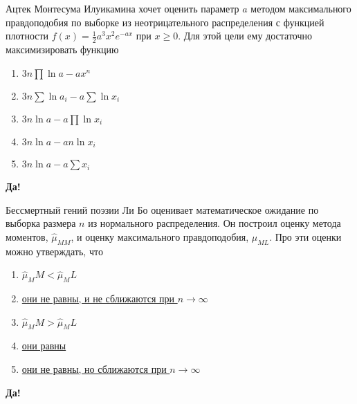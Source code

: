 \documentclass[t]{beamer}
\begin{document}
 \begin{frame} \label{21-Yes} 
\begin{block}{21} 

Ацтек Монтесума Илуикамина хочет оценить параметр $a$ методом максимального правдоподобия по выборке из неотрицательного распределения с функцией плотности $f(x)=\frac{1}{2}a^3x^2e^{-ax}$ при $x\geq 0$. Для этой цели ему достаточно максимизировать функцию
 


 \end{block} 
\begin{enumerate} 
\item[] \hyperlink{21-No}{\beamergotobutton{} $3n\prod \ln a - a x^n$}
\item[] \hyperlink{21-No}{\beamergotobutton{} $3n \sum \ln a_i - a \sum \ln x_i$}
\item[] \hyperlink{21-No}{\beamergotobutton{} $3n\ln a - a \prod \ln x_i$}
\item[] \hyperlink{21-No}{\beamergotobutton{} $3n \ln a - an \ln x_i$}
\item[] \hyperlink{21-Yes}{\beamergotobutton{} $3n \ln a - a \sum x_i$}
\end{enumerate} 

 \textbf{Да!} 
 \hyperlink{22}{}\end{frame} 


 \begin{frame} \label{22-Yes} 
\begin{block}{22} 

Бессмертный гений поэзии Ли Бо оценивает математическое ожидание  по выборка размера $n$ из нормального распределения. Он построил оценку метода моментов, $\hat{\mu}_{MM}$, и оценку максимального правдоподобия, $\hat{\mu}_{ML}$. Про эти оценки можно утверждать, что
 


 \end{block} 
\begin{enumerate} 
\item[] \hyperlink{22-No}{\beamergotobutton{} $\hat\mu_MM<\hat\mu_ML$ }
\item[] \hyperlink{22-No}{\beamergotobutton{} они не равны, и не сближаются при $n\to \infty$}
\item[] \hyperlink{22-No}{\beamergotobutton{} $\hat\mu_MM>\hat\mu_ML$}
\item[] \hyperlink{22-Yes}{\beamergotobutton{} они равны}
\item[] \hyperlink{22-No}{\beamergotobutton{} они не равны, но сближаются при $n\to \infty$}
\end{enumerate} 

 \textbf{Да!} 
 \hyperlink{23}{}\end{frame} 
\end{document}
